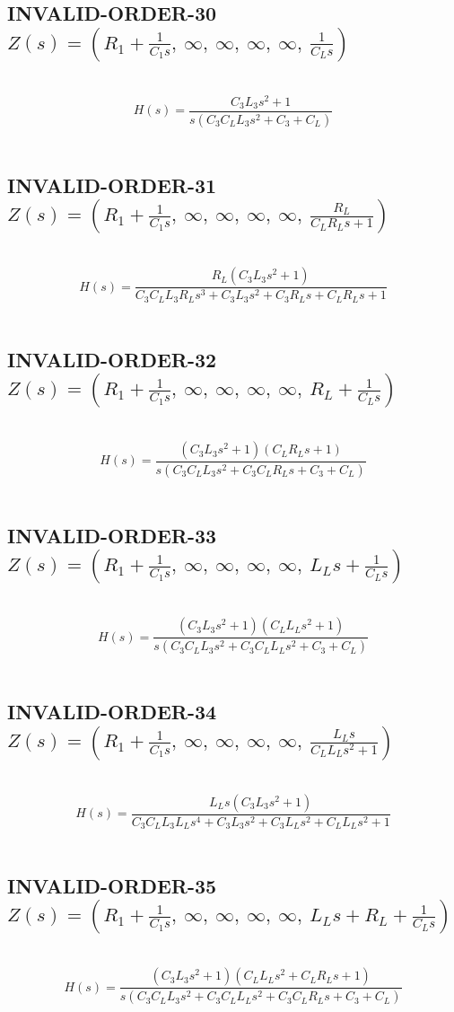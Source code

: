 \documentclass{article}
\begin{document}
\subsection{INVALID-ORDER-30 $Z(s) = \left( R_{1} + \frac{1}{C_{1} s}, \  \infty, \  \infty, \  \infty, \  \infty, \  \frac{1}{C_{L} s}\right)$ } \ 
\textbf{\[H(s) = \frac{C_{3} L_{3} s^{2} + 1}{s \left(C_{3} C_{L} L_{3} s^{2} + C_{3} + C_{L}\right)}\] } \ 
\subsection{INVALID-ORDER-31 $Z(s) = \left( R_{1} + \frac{1}{C_{1} s}, \  \infty, \  \infty, \  \infty, \  \infty, \  \frac{R_{L}}{C_{L} R_{L} s + 1}\right)$ } \ 
\textbf{\[H(s) = \frac{R_{L} \left(C_{3} L_{3} s^{2} + 1\right)}{C_{3} C_{L} L_{3} R_{L} s^{3} + C_{3} L_{3} s^{2} + C_{3} R_{L} s + C_{L} R_{L} s + 1}\] } \ 
\subsection{INVALID-ORDER-32 $Z(s) = \left( R_{1} + \frac{1}{C_{1} s}, \  \infty, \  \infty, \  \infty, \  \infty, \  R_{L} + \frac{1}{C_{L} s}\right)$ } \ 
\textbf{\[H(s) = \frac{\left(C_{3} L_{3} s^{2} + 1\right) \left(C_{L} R_{L} s + 1\right)}{s \left(C_{3} C_{L} L_{3} s^{2} + C_{3} C_{L} R_{L} s + C_{3} + C_{L}\right)}\] } \ 
\subsection{INVALID-ORDER-33 $Z(s) = \left( R_{1} + \frac{1}{C_{1} s}, \  \infty, \  \infty, \  \infty, \  \infty, \  L_{L} s + \frac{1}{C_{L} s}\right)$ } \ 
\textbf{\[H(s) = \frac{\left(C_{3} L_{3} s^{2} + 1\right) \left(C_{L} L_{L} s^{2} + 1\right)}{s \left(C_{3} C_{L} L_{3} s^{2} + C_{3} C_{L} L_{L} s^{2} + C_{3} + C_{L}\right)}\] } \ 
\subsection{INVALID-ORDER-34 $Z(s) = \left( R_{1} + \frac{1}{C_{1} s}, \  \infty, \  \infty, \  \infty, \  \infty, \  \frac{L_{L} s}{C_{L} L_{L} s^{2} + 1}\right)$ } \ 
\textbf{\[H(s) = \frac{L_{L} s \left(C_{3} L_{3} s^{2} + 1\right)}{C_{3} C_{L} L_{3} L_{L} s^{4} + C_{3} L_{3} s^{2} + C_{3} L_{L} s^{2} + C_{L} L_{L} s^{2} + 1}\] } \ 
\subsection{INVALID-ORDER-35 $Z(s) = \left( R_{1} + \frac{1}{C_{1} s}, \  \infty, \  \infty, \  \infty, \  \infty, \  L_{L} s + R_{L} + \frac{1}{C_{L} s}\right)$ } \ 
\textbf{\[H(s) = \frac{\left(C_{3} L_{3} s^{2} + 1\right) \left(C_{L} L_{L} s^{2} + C_{L} R_{L} s + 1\right)}{s \left(C_{3} C_{L} L_{3} s^{2} + C_{3} C_{L} L_{L} s^{2} + C_{3} C_{L} R_{L} s + C_{3} + C_{L}\right)}\] } \ 
\end{document}
